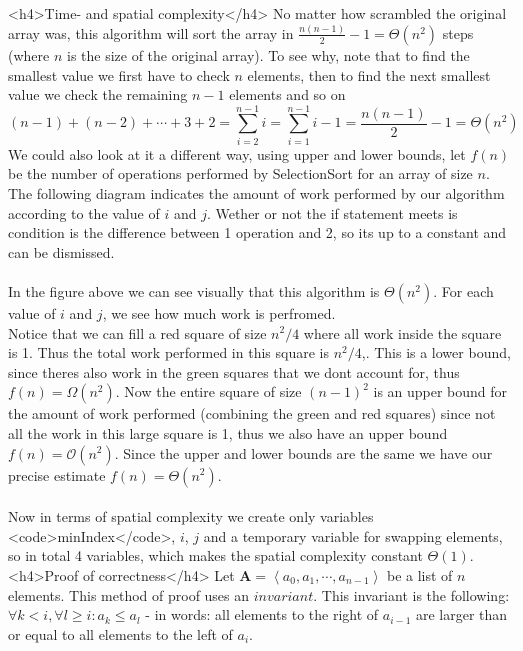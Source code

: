 <h4>Time- and spatial complexity</h4>
No matter how scrambled 
the original array was, this algorithm will sort the array in $\frac{n(n-1)}{2}-1=
\Theta(n^2)$ steps 
(where $n$ is the size of the original array). To see why, note that to find the smallest
value we first have to check $n$ elements, then to find the next smallest value we check
the remaining $n-1$ elements and so on
\[
    (n-1)+(n-2)+\cdots+3+2=\sum_{i=2}^{n-1} i=\sum_{i=1}^{n-1} i-1=\frac{n(n-1)}{2}-1=\Theta (n^2)
\]
We could also look at it a different way, using upper and lower bounds, let $f(n)$ be the
number of operations performed by SelectionSort for an array of size $n$. The following
diagram indicates the amount of work performed by our algorithm according to the value
of $i$ and $j$. Wether or not the if statement meets is condition is the difference 
between 1 operation and 2, so its up to a constant and can be dismissed.
\\\\
In the figure above we can see visually that this algorithm is $\Theta(n^2)$. For each value of
$i$ and $j$, we see how much work is perfromed.\\
Notice that we can fill a red square of size $n^2/4$ where all work inside the 
square is 1. Thus the total work performed in this square is $n^2/4$,. This is a
lower bound, since theres also work in the green squares that we dont account for, thus $f(n)=\Omega(n^2)$. 
Now the entire square of size $(n-1)^2$ is an upper bound for the amount of work performed (combining the green and red squares) 
since not all the work in this large square is 1, thus we also have an upper bound $f(n)=\mathcal O (n^2)$. 
Since the upper and lower bounds are the same we have our precise estimate $f(n)=\Theta(n^2)$.
\\\\
Now in terms of spatial complexity we create only variables <code>minIndex</code>, $i$, $j$
and a temporary variable for swapping elements, so in total 4 variables, which
makes the spatial complexity constant $\Theta(1)$.
<h4>Proof of correctness</h4>
Let $\mathbf A =\left< a_0,a_1,\cdots,a_{n-1}\right>$ be a list of $n$ elements.
This method of proof uses an $invariant$. This invariant is the following:
$\forall k< i,\forall l\geq i: a_k\leq a_l$ - in words: all elements to the right of 
$a_{i-1}$ are larger than or equal to all elements to the left of $a_i$.
